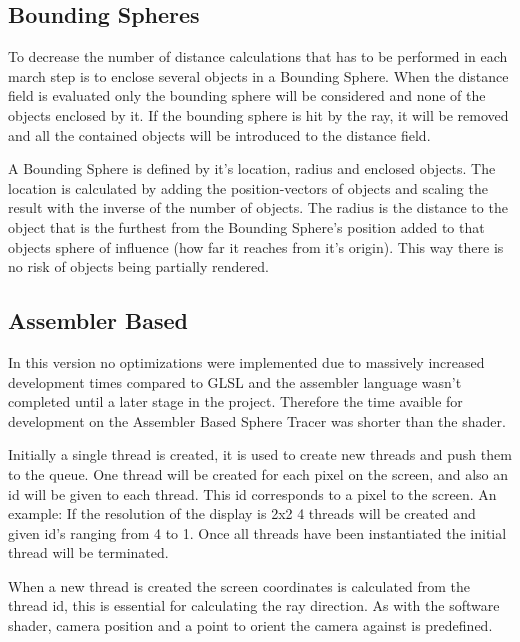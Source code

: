 		\subsection{Bounding Spheres}
			
			To decrease the number of distance calculations that has to be
			performed in each march step is to enclose several objects in a
			Bounding Sphere. When the distance field is evaluated only the
			bounding sphere will be considered and none of the objects enclosed
			by it. If the bounding sphere is hit by the ray, it will be removed
			and all the contained objects will be introduced to the distance
			field.
			
			A Bounding Sphere is defined by it's location, radius and enclosed
			objects. The location is calculated by adding the position-vectors
			of objects and scaling the result with the inverse of the number of
			objects. The radius is the distance to the object that is the
			furthest from the Bounding Sphere's position added to that objects
			sphere of influence (how far it reaches from it's origin). This
			way there is no risk of objects being partially rendered.


		\subsection{Assembler Based}

			In this version no optimizations were implemented due to massively 
			increased development times compared to GLSL and the assembler 
			language wasn't completed until a later stage in the project. Therefore the 
			time avaible for development on the Assembler Based Sphere Tracer 
			was shorter than the shader.

			Initially a single thread is created, it is used to create new 
			threads and push them to the queue. One thread will be created for
			each pixel on the screen, and also an id will be given to 
			each thread. This id corresponds to a pixel to the screen. 
			An example: If the resolution of the display is 2x2 4 threads will 
			be created and given id's ranging from 4 to 1. Once all threads have
			been instantiated the initial thread will be terminated.

			When a new thread is created the screen coordinates is calculated 
			from the thread id, this is essential for calculating the ray 
			direction. As with the software shader, camera position and a point 
			to orient the camera against is predefined. 

